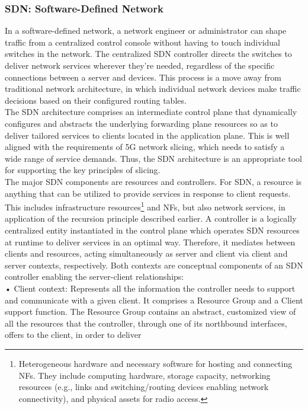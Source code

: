\documentclass{article}
\begin{document}
\subsubsection{SDN: Software-Defined Network}
In a software-defined network, a network engineer or administrator can shape traffic from a centralized control console without having to touch individual switches in the network. The centralized SDN controller directs the switches to deliver network services wherever they're needed, regardless of the specific connections between a server and devices. This process is a move away from traditional network architecture, in which individual network devices make traffic decisions based on their configured routing tables.\\
The SDN architecture comprises an intermediate control plane that dynamically configures and abstracts the underlying
forwarding plane resources so as to deliver tailored services to clients located in the application plane. This is
well aligned with the requirements of 5G network
slicing, which needs to satisfy a wide range of service demands. Thus, the SDN architecture is an appropriate
tool for supporting the key principles of slicing.\\
The major SDN components are resources and controllers. For
SDN, a resource is anything that can be utilized to
provide services in response to client requests. This
includes infrastructure resources\footnote{Heterogeneous hardware and necessary software for hosting and connecting NFs. They include computing hardware,
storage capacity, networking resources (e.g., links
and switching/routing devices enabling network
connectivity), and physical assets for radio access.
} and NFs, but also
network services, in application of the recursion
principle described earlier. A controller is a logically centralized entity instantiated in the control
plane which operates SDN resources at runtime
to deliver services in an optimal way. Therefore,
it mediates between clients and resources, acting simultaneously as server and client via client
and server contexts, respectively. Both contexts
are conceptual components of an SDN controller
enabling the server-client relationships:\\
• Client context: Represents all the information the
controller needs to support and communicate with
a given client. It comprises a Resource Group and
a Client support function. The Resource Group contains an abstract, customized view of all the resources that the controller, through one of its northbound
interfaces, offers to the client, in order to deliver
\end{document}

